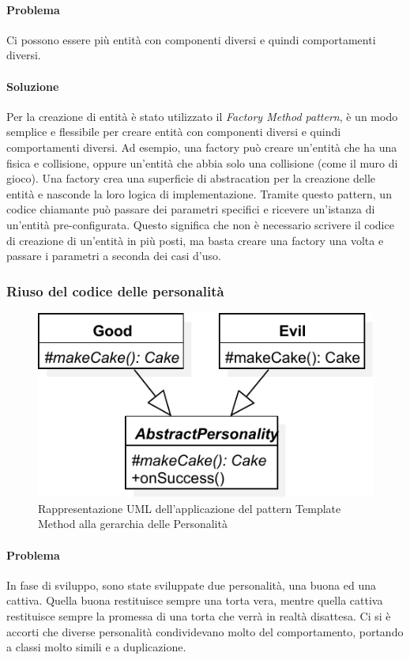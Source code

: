 \documentclass[a4paper,12pt]{report}
\begin{document}
\paragraph{Problema} Ci possono essere più entità con componenti diversi e quindi comportamenti diversi.
\paragraph{Soluzione} Per la creazione di entità è stato utilizzato il \textit{Factory Method pattern}, è un modo semplice e flessibile 
per creare entità con componenti diversi e quindi comportamenti diversi. Ad esempio, una factory può creare un'entità che ha una 
fisica e collisione, oppure un’entità che abbia solo una collisione (come il muro di gioco). Una factory crea una superficie di 
abstracation per la creazione delle entità e nasconde la loro logica di implementazione. Tramite questo pattern, un codice chiamante può 
passare dei parametri specifici e ricevere un'istanza di un'entità pre-configurata. Questo significa che non è necessario scrivere il codice 
di creazione di un'entità in più posti, ma basta creare una factory una volta e passare i parametri a seconda dei casi d'uso.

\subsubsection{Riuso del codice delle personalità}

\begin{figure}[H]
\centering{}
\includegraphics[width=\textwidth]{img/template}
\caption{Rappresentazione UML dell'applicazione del pattern Template Method alla gerarchia delle Personalità}
\label{img:template}
\end{figure}

\paragraph{Problema} In fase di sviluppo, sono state sviluppate due personalità, una buona ed una cattiva.
Quella buona restituisce sempre una torta vera, mentre quella cattiva restituisce sempre la
promessa di una torta che verrà in realtà disattesa.
Ci si è accorti che diverse personalità condividevano molto del comportamento,
portando a classi molto simili e a duplicazione.
\end{document}
